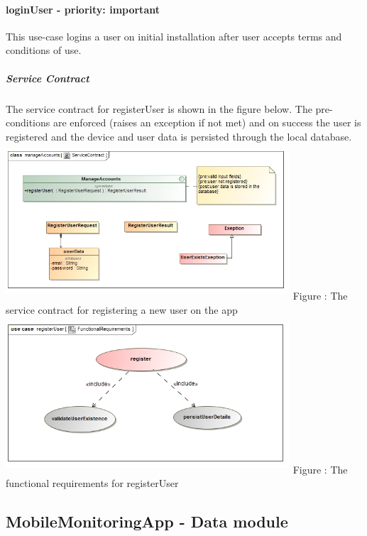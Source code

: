 \documentclass[hidelinks, 12pt, oneside]{article}
\begin{document}
	\paragraph{loginUser - priority: important}
		This use-case logins a user on initial installation after user accepts terms and conditions of use.\newline	
	\subparagraph{Service Contract}
		The service contract for registerUser is shown in the figure below. The pre-conditions are enforced (raises an exception if not met) and on
		success the user is registered and the device and user data is persisted through the local database.\newline
	\includegraphics[width=400px,height=220px]{img/serviceContractRegisterUser.jpg}
		Figure : The service contract for registering a new user on the app\newline
	\includegraphics[width=400px,height=220px]{img/functionalRequirementsRegister.jpg}
		Figure : The functional requirements for registerUser\newline
	
	
	
	\subsection{MobileMonitoringApp - Data module}
\end{document}
